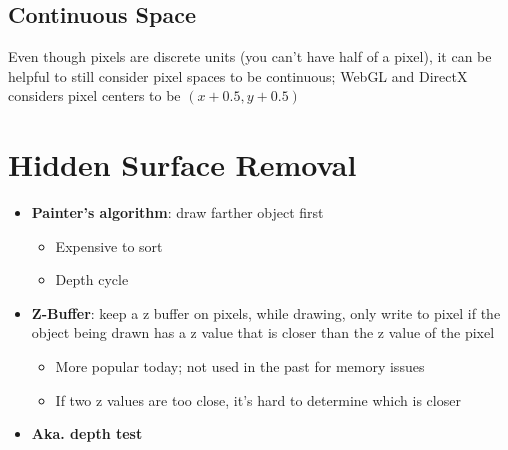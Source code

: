   \subsection{Continuous Space}

    Even though pixels are discrete units (you can't have half of a pixel),
    it can be helpful to still consider pixel spaces to be continuous; WebGL
    and DirectX considers pixel centers to be
    $ \left( x + 0.5, y + 0.5 \right) $

\section{Hidden Surface Removal}

  \begin{itemize}
    \item \textbf{Painter's algorithm}: draw farther object first
    \begin{itemize}
      \item Expensive to sort
      \item Depth cycle
    \end{itemize}

    \item \textbf{Z-Buffer}: keep a z buffer on pixels, while drawing,
    only write to pixel if the object being drawn has a z value that is
    closer than the z value of the pixel
    \begin{itemize}
      \item More popular today; not used in the past for memory issues
      \item If two z values are too close, it's hard to determine which is
      closer
    \end{itemize}

    \item \textbf{Aka. depth test}
  \end{itemize}
